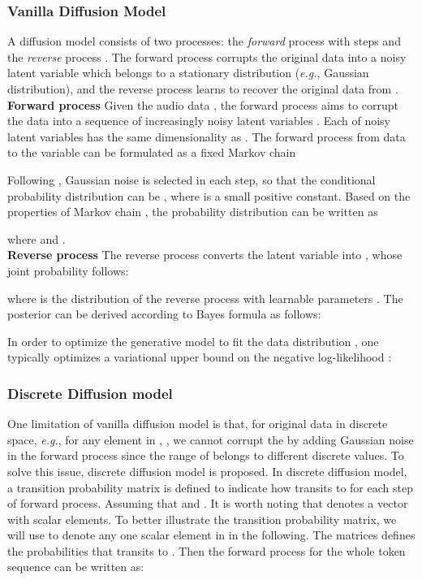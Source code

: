 \documentclass[lettersize,journal]{IEEEtran}
\begin{document}
\subsubsection{Vanilla Diffusion Model}
A diffusion model consists of two processes: the \textit{forward} process with steps  and the \textit{reverse} process . The forward process corrupts the original data  into a noisy latent variable  which belongs to a stationary distribution (\textit{e.g.}, Gaussian distribution), and the reverse process learns to recover the original data  from .\\
\textbf{Forward process}
Given the audio data , the forward process aims to corrupt the data  into a sequence of increasingly noisy latent variables . Each of noisy latent variables  has the {\color{black}same dimensionality as} . The forward process from data  to the
variable  can be formulated as a fixed Markov chain

Following \cite{sohl2015deep}, Gaussian noise is selected in each step, so that the conditional probability distribution can be  , where  is a small positive constant. {} 
Based on the properties of Markov chain \cite{ho2020denoising}, the probability distribution  can be written as

where  and . \\
\textbf{Reverse process}
The reverse process converts the latent variable  into , whose joint probability follows:

where  is the distribution of the reverse process with learnable parameters . The posterior  can be derived according to Bayes formula as follows:
{\color{black}

}
In order to optimize the generative model  to fit the data distribution , one typically optimizes a variational upper bound on the negative log-likelihood {}:

\subsubsection{Discrete Diffusion model} \label{bkg:ddm}
One limitation of vanilla diffusion model is that, for original data  in discrete space, \textit{e.g.}, for any element  in , , we cannot  corrupt the  by adding Gaussian noise in the forward process since the range of  belongs to  different discrete values. To solve this issue, discrete diffusion model \cite{sohl2015deep,austin2021structured} is proposed.
In discrete diffusion model, a transition probability matrix is defined to indicate how  transits to  for each step of forward process. Assuming that  and . It is worth noting that  denotes a vector with  scalar elements. {\color{black}To better illustrate the transition probability matrix, we will use  to denote any one scalar element in  in the following.} The matrices  defines the probabilities that  transits to . Then the forward process for the whole token sequence can be written as:
\end{document}
